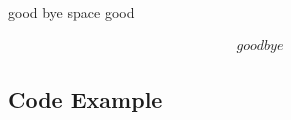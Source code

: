 \documentclass{mcmthesis}
\begin{document}



\newpage
\cite{ho}

good  bye  space  good 


\begin{align}
	good  bye
\end{align}

\printbibliography

% 


\begin{appendices}
\section{Code Example}


\end{appendices}
\end{document}
